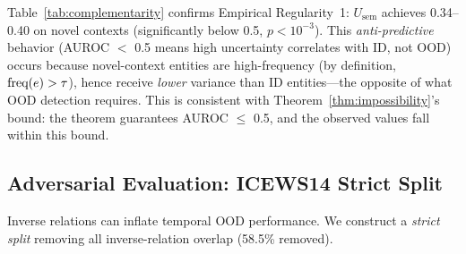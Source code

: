 \begin{table}[t]
\centering
\caption{\textbf{Stratified OOD detection} (multi-seed mean). Nov.\ = novel-context AUROC (1.0 by construction on static benchmarks$^\ddagger$; non-circular on ICEWS$^*$).\label{tab:complementarity}}
\end{table}

Table~\ref{tab:complementarity} confirms Empirical Regularity~1: $U_{\text{sem}}$ achieves 0.34--0.40 on novel contexts (significantly below 0.5, $p < 10^{-3}$). This \emph{anti-predictive} behavior (AUROC $<$ 0.5 means high uncertainty correlates with ID, not OOD) occurs because novel-context entities are high-frequency (by definition, $\text{freq}(e) > \tau$), hence receive \emph{lower} variance than ID entities---the opposite of what OOD detection requires. This is consistent with Theorem~\ref{thm:impossibility}'s bound: the theorem guarantees AUROC $\leq$ 0.5, and the observed values fall within this bound.

\subsection{Adversarial Evaluation: ICEWS14 Strict Split}

Inverse relations can inflate temporal OOD performance. We construct a \emph{strict split} removing all inverse-relation overlap (58.5\% removed).

